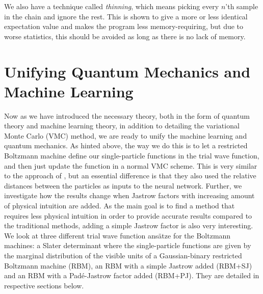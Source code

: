 We also have a technique called \textit{thinning}, which means picking every $n$'th sample in the chain and ignore the rest. This is shown to give a more or less identical expectation value and makes the program less memory-requiring, but due to worse statistics, this should be avoided as long as there is no lack of memory. 

\section{Unifying Quantum Mechanics and Machine Learning} \label{sec:unifying}
Now as we have introduced the necessary theory, both in the form of quantum theory and machine learning theory, in addition to detailing the variational Monte Carlo (VMC) method, we are ready to unify the machine learning and quantum mechanics. As hinted above, the way we do this is to let a restricted Boltzmann machine define our single-particle functions in the trial wave function, and then just update the function in a normal VMC scheme. This is very similar to the approach of \citet{pfau2019abinitio}, but an essential difference is that they also used the relative distances between the particles as inputs to the neural network. Further, we investigate how the results change when Jastrow factors with increasing amount of physical intuition are added. As the main goal is to find a method that requires less physical intuition in order to provide accurate results compared to the traditional methods, adding a simple Jastrow factor is also very interesting. We look at three different trial wave function ansätze for the Boltzmann machines: a Slater determinant where the single-particle functions are given by the marginal distribution of the visible units of a Gaussian-binary restricted Boltzmann machine (RBM), an RBM with a simple Jastrow added (RBM+SJ) and an RBM with a Padé-Jastrow factor added (RBM+PJ). They are detailed in respective sections below.

